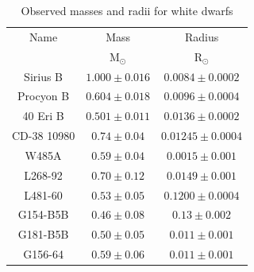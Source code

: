 \documentclass[twoside]{article}
\begin{document}
\begin{table}[H]
    \caption{Observed masses and radii for white dwarfs}
    \centering
    \begin{tabular}{c c c}
    \toprule
    Name & Mass & Radius \\
         & \(\mathrm{M}_{\odot}\) & \(\mathrm{R}_{\odot}\) \\
    \midrule
    Sirius B & \(1.000\pm0.016\) & \(0.0084\pm0.0002\) \\
    Procyon B & \(0.604\pm0.018\) & \(0.0096\pm0.0004\) \\
    40 Eri B & \(0.501\pm0.011\) & \(0.0136\pm0.0002\) \\
    CD-38 10980 & \(0.74\pm0.04\) & \(0.01245\pm0.0004\) \\
    W485A & \(0.59\pm0.04\) & \(0.0015\pm0.001\) \\
    L268-92 & \(0.70\pm0.12\) & \(0.0149\pm0.001\) \\
    L481-60 & \(0.53\pm0.05\) & \(0.1200\pm0.0004\) \\
    G154-B5B & \(0.46\pm0.08\) & \(0.13\pm0.002\) \\
    G181-B5B & \(0.50\pm0.05\) & \(0.011\pm0.001\) \\
    G156-64 & \(0.59\pm0.06\) & \(0.011\pm0.001\) \\
    \bottomrule
    \end{tabular}
\end{table}
\end{document}
